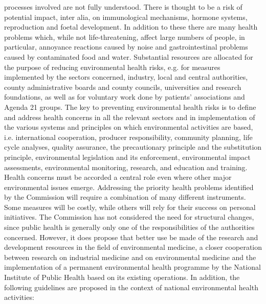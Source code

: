 processes involved are not fully understood. There is thought to be a risk of potential impact, inter alia, on immunological mechanisms, hormone systems, reproduction and foetal development.
In addition to these there are many health problems which, while not life-threatening, affect large numbers of people, in particular, annoyance reactions caused by noise and gastrointestinal problems caused by contaminated food and water.
Substantial resources are allocated for the purpose of reducing environmental health risks, e.g. for measures implemented by the sectors concerned, industry, local and central authorities, county administrative boards and county councils, universities and research foundations, as well as for voluntary work done by patients' associations and Agenda 21 groups.
The key to preventing environmental health risks is to define and address health concerns in all the relevant sectors and in implementation of the various systems and principles on which environmental activities are based, i.e. international cooperation, producer responsibility, community planning, life cycle analyses, quality assurance, the precautionary principle and the substitution principle, environmental legislation and its enforcement, environmental impact assessments, environmental monitoring, research, and education and training. Health concerns must be accorded a central role even where other major environmental issues emerge. Addressing the priority health problems identified by the Commission will require a combination of many different instruments. Some measures will be costly, while others will rely for their success on personal initiatives.
The Commission has not considered the need for structural changes, since public health is generally only one of the responsibilities of the authorities concerned. However, it does propose that better use be made of the research and development resources in the field of environmental medicine, a closer cooperation between research on industrial medicine and on environmental medicine and the implementation of a permanent environmental health programme by the National Institute of Public Health based on its existing operations.
In addition, the following guidelines are proposed in the context of national environmental health activities:

